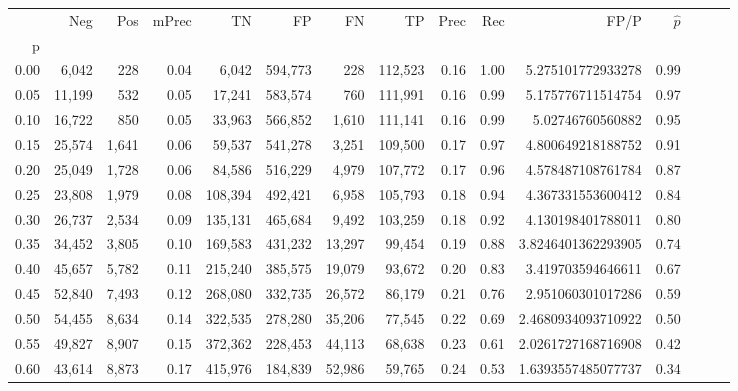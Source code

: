\begin{tabular}{rrrrrrrrrrrrrrr}
\toprule
{} &     Neg &    Pos & mPrec &       TN &       FP &       FN &       TP &  Prec &   Rec &                 FP/P & $\hat{p}$ \\
p    &         &        &       &          &          &          &          &       &       &                      &           \\
\midrule
0.00 &   6,042 &    228 &  0.04 &    6,042 &  594,773 &      228 &  112,523 &  0.16 &  1.00 &    5.275101772933278 &      0.99 \\
0.05 &  11,199 &    532 &  0.05 &   17,241 &  583,574 &      760 &  111,991 &  0.16 &  0.99 &    5.175776711514754 &      0.97 \\
0.10 &  16,722 &    850 &  0.05 &   33,963 &  566,852 &    1,610 &  111,141 &  0.16 &  0.99 &     5.02746760560882 &      0.95 \\
0.15 &  25,574 &  1,641 &  0.06 &   59,537 &  541,278 &    3,251 &  109,500 &  0.17 &  0.97 &    4.800649218188752 &      0.91 \\
0.20 &  25,049 &  1,728 &  0.06 &   84,586 &  516,229 &    4,979 &  107,772 &  0.17 &  0.96 &    4.578487108761784 &      0.87 \\
0.25 &  23,808 &  1,979 &  0.08 &  108,394 &  492,421 &    6,958 &  105,793 &  0.18 &  0.94 &    4.367331553600412 &      0.84 \\
0.30 &  26,737 &  2,534 &  0.09 &  135,131 &  465,684 &    9,492 &  103,259 &  0.18 &  0.92 &    4.130198401788011 &      0.80 \\
0.35 &  34,452 &  3,805 &  0.10 &  169,583 &  431,232 &   13,297 &   99,454 &  0.19 &  0.88 &   3.8246401362293905 &      0.74 \\
0.40 &  45,657 &  5,782 &  0.11 &  215,240 &  385,575 &   19,079 &   93,672 &  0.20 &  0.83 &    3.419703594646611 &      0.67 \\
0.45 &  52,840 &  7,493 &  0.12 &  268,080 &  332,735 &   26,572 &   86,179 &  0.21 &  0.76 &    2.951060301017286 &      0.59 \\
0.50 &  54,455 &  8,634 &  0.14 &  322,535 &  278,280 &   35,206 &   77,545 &  0.22 &  0.69 &   2.4680934093710922 &      0.50 \\
0.55 &  49,827 &  8,907 &  0.15 &  372,362 &  228,453 &   44,113 &   68,638 &  0.23 &  0.61 &   2.0261727168716908 &      0.42 \\
0.60 &  43,614 &  8,873 &  0.17 &  415,976 &  184,839 &   52,986 &   59,765 &  0.24 &  0.53 &   1.6393557485077737 &      0.34 \\

\end{tabular}
